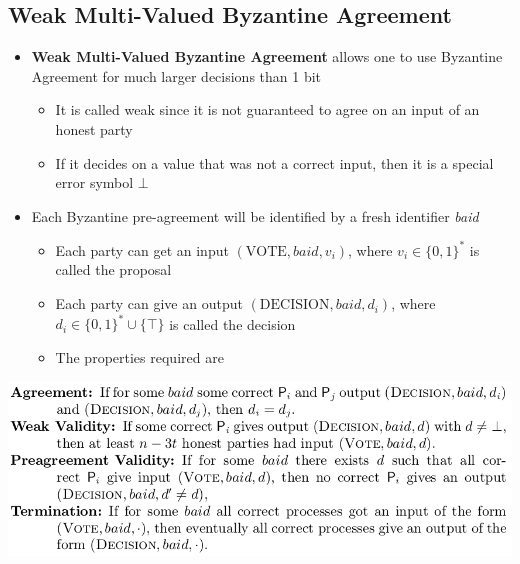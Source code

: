 \documentclass[11pt]{article}
\begin{document}
\subsection{Weak Multi-Valued Byzantine Agreement}
\label{sec:org72817cb}
\begin{itemize}
\item \textbf{Weak Multi-Valued Byzantine Agreement} allows one to use Byzantine Agreement for much larger decisions than 1 bit 
\begin{itemize}
\item It is called weak since it is not guaranteed to agree on an input of an honest party
\item If it decides on a value that was not a correct input, then it is a special error symbol \(\bot\)
\end{itemize}

\item Each Byzantine pre-agreement will be identified by a fresh identifier \emph{baid}
\begin{itemize}
\item Each party can get an input \((\text{VOTE}, baid, v_i)\), where \(v_i \in \{0,1\}^*\) is called the proposal
\item Each party can give an output \((\text{DECISION}, baid, d_i)\), where \(d_i \in \{0,1\}^* \cup \{\top\}\) is called the decision
\item The properties required are
\end{itemize}
\end{itemize}
\begin{center}
\includegraphics[width=.9\linewidth]{Asynchronous Agreement (8)/screenshot_2018-09-30_08-47-49.png}
\end{center}
\end{document}
